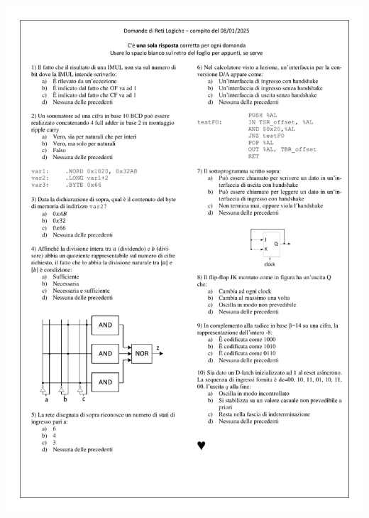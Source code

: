 \documentclass[a4paper,12pt]{article}
\begin{document}
\includegraphics[width = \textwidth]{pretestImage/Domande RL 20250108.pdf}
\newpage
\end{document}
